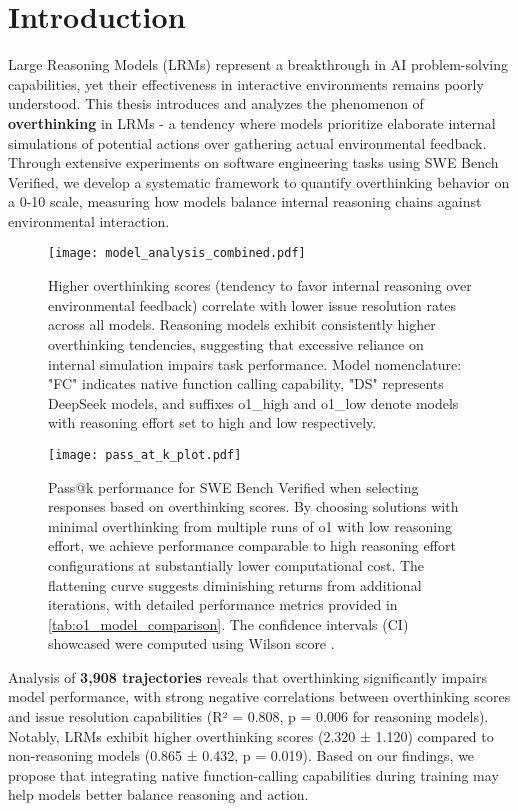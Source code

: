 \chapter{Introduction}
\label{intro}

Large Reasoning Models (LRMs) represent a breakthrough in AI problem-solving capabilities, yet their effectiveness in interactive environments remains poorly understood. This thesis introduces and analyzes the phenomenon of \textbf{overthinking} in LRMs - a tendency where models prioritize elaborate internal simulations of potential actions over gathering actual environmental feedback. Through extensive experiments on software engineering tasks using SWE Bench Verified, we develop a systematic framework to quantify overthinking behavior on a 0-10 scale, measuring how models balance internal reasoning chains against environmental interaction.

\begin{figure}[t]
    \centering
    \texttt{[image: model\_analysis\_combined.pdf]}
    \caption{Higher overthinking scores (tendency to favor internal reasoning over environmental feedback) correlate with lower issue resolution rates across all models. Reasoning models exhibit consistently higher overthinking tendencies, suggesting that excessive reliance on internal simulation impairs task performance. Model nomenclature: "FC" indicates native function calling capability, "DS" represents DeepSeek models, and suffixes o1\_high and o1\_low denote models with reasoning effort set to high and low respectively.}
    \label{fig:figure1}
\end{figure}

\begin{figure}[t]
    \centering
    \texttt{[image: pass\_at\_k\_plot.pdf]}
    \caption{Pass@k performance for SWE Bench Verified when selecting responses based on overthinking scores. By choosing solutions with minimal overthinking from multiple runs of o1 with low reasoning effort, we achieve performance comparable to high reasoning effort configurations at substantially lower computational cost. The flattening curve suggests diminishing returns from additional iterations, with detailed performance metrics provided in \cref{tab:o1_model_comparison}. The confidence intervals (CI) showcased were computed using Wilson score \cite{wallis2013binomial}.}
    \label{fig:figure2}
\end{figure}

Analysis of \textbf{3,908 trajectories} reveals that overthinking significantly impairs model performance, with strong negative correlations between overthinking scores and issue resolution capabilities (R² = 0.808, p = 0.006 for reasoning models). Notably, LRMs exhibit higher overthinking scores (2.320 ± 1.120) compared to non-reasoning models (0.865 ± 0.432, p = 0.019). Based on our findings, we propose that integrating native function-calling capabilities during training may help models better balance reasoning and action.

